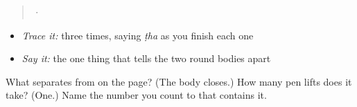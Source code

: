 \begin{quote}
  ·  
\end{quote}

\begin{itemize}
\raggedright
  \item \emph{Trace it:}  three times, saying \emph{ṭha} as you finish each one
  \item \emph{Say it:} the one thing that tells the two round bodies apart
\end{itemize}

\begin{tcolorbox}[breakable,colback=teal!4,colframe=teal!35!black,title={Before you move on}]
What separates \textbf{} from \textbf{} on the page? (The body closes.) How many pen lifts does it take? (One.) Name the number you count to that contains it.
\end{tcolorbox}
